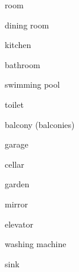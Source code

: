\documentclass[avery5371,grid,frame]{flashcards}
\begin{document}
\begin{flashcard}{\LARGE room}
\LARGE {}
\end{flashcard}
\begin{flashcard}{\LARGE dining room}
\LARGE {}
\end{flashcard}
\begin{flashcard}{\LARGE kitchen}
\LARGE {}
\end{flashcard}
\begin{flashcard}{\LARGE bathroom}
\LARGE {}
\end{flashcard}
\begin{flashcard}{\LARGE swimming pool}
\LARGE {}
\end{flashcard}
\begin{flashcard}{\LARGE toilet}
\LARGE {}
\end{flashcard}
\begin{flashcard}{\LARGE balcony (balconies)}
\LARGE {}
\end{flashcard}
\begin{flashcard}{\LARGE garage}
\LARGE {}
\end{flashcard}
\begin{flashcard}{\LARGE cellar}
\LARGE {}
\end{flashcard}
\begin{flashcard}{\LARGE garden}
\LARGE {}
\end{flashcard}
\begin{flashcard}{\LARGE mirror}
\LARGE {}
\end{flashcard}
\begin{flashcard}{\LARGE elevator}
\LARGE {}
\end{flashcard}
\begin{flashcard}{\LARGE washing machine}
\LARGE {}
\end{flashcard}
\begin{flashcard}{\LARGE sink}
\LARGE {}
\end{flashcard}
\end{document}

